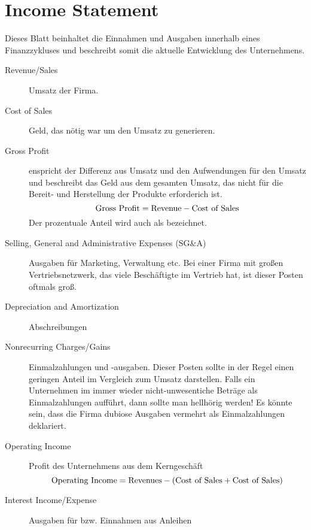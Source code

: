 %
\section{Income Statement}
Dieses Blatt beinhaltet die Einnahmen und Ausgaben innerhalb eines Finanzzykluses und beschreibt somit die aktuelle Entwicklung des Unternehmens.

\begin{description}
    \item[Revenue/Sales] Umsatz der Firma.
    \item[Cost of Sales] Geld, das nötig war um den Umsatz zu generieren.
    \item[Gross Profit] enspricht der Differenz aus Umsatz und den Aufwendungen für den Umsatz und beschreibt das Geld aus dem gesamten Umsatz, das nicht für die Bereit- und Herstellung der Produkte erforderich ist.
        \begin{equation}
            \text{Gross Profit} = \text{Revenue} - \text{Cost of Sales}
        \end{equation}
        Der prozentuale Anteil wird auch als  bezeichnet. 
    \item[Selling, General and Administrative Expenses (SG\&A)] Ausgaben für Marketing, Verwaltung etc.
        Bei einer Firma mit großen Vertriebsnetzwerk, das viele Beschäftigte im Vertrieb hat, ist dieser Posten oftmals groß.
    \item[Depreciation and Amortization] Abschreibungen
    \item[Nonrecurring Charges/Gains] Einmalzahlungen und -ausgaben.
        Dieser Posten sollte in der Regel einen geringen Anteil im Vergleich zum Umsatz darstellen.
        Falls ein Unternehmen im  immer wieder nicht-unwesentiche Beträge als Einmalzahlungen aufführt, dann sollte man hellhörig werden!
        Es könnte sein, dass die Firma dubiose Ausgaben vermehrt als Einmalzahlungen deklariert.
    \item[Operating Income] Profit des Unternehmens aus dem Kerngeschäft
        \begin{equation}
            \text{Operating Income} = \text{Revenues} - \left( \text{Cost of Sales} + \text{Cost of Sales}\right)
        \end{equation}
    \item[Interest Income/Expense] Ausgaben für bzw. Einnahmen aus Anleihen

\end{description}
